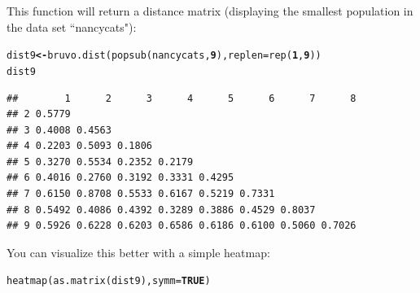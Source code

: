 \documentclass[letterpaper]{article}\usepackage[]{graphicx}\usepackage[]{color}
\makeatletter
\newcommand{\hlnum}[1]{\textcolor[rgb]{0.502,0,0.502}{\textbf{#1}}}%
\newcommand{\hlstd}[1]{\textcolor[rgb]{0,0,0}{#1}}%
\newcommand{\hlkwb}[1]{\textcolor[rgb]{0.502,0.502,0.753}{\textbf{#1}}}%
\newcommand{\hlkwc}[1]{\textcolor[rgb]{0,0.502,0.753}{#1}}%
\newcommand{\hlkwd}[1]{\textcolor[rgb]{0,0.267,0.4}{#1}}%
\newenvironment{kframe}{%
 \def\at@end@of@kframe{}%
 \ifinner\ifhmode%
  \def\at@end@of@kframe{\end{minipage}}%
  \begin{minipage}{\columnwidth}%
 \fi\fi%
 \def\FrameCommand##1{\hskip\@totalleftmargin \hskip-\fboxsep
 \colorbox{shadecolor}{##1}\hskip-\fboxsep
     \hskip-\linewidth \hskip-\@totalleftmargin \hskip\columnwidth}%
 \MakeFramed {\advance\hsize-\width
   \@totalleftmargin\z@ \linewidth\hsize
   \@setminipage}}%
 {\par\unskip\endMakeFramed%
 \at@end@of@kframe}
\newenvironment{knitrout}{}{} %
\makeatother
\begin{document}
This function will return a distance matrix (displaying the smallest population in the data set ``nancycats"):
\begin{knitrout}\footnotesize
{}\color{fgcolor}\begin{kframe}
\begin{alltt}
\hlstd{dist9} \hlkwb{<-} \hlkwd{bruvo.dist}\hlstd{(}\hlkwd{popsub}\hlstd{(nancycats,} \hlnum{9}\hlstd{),} \hlkwc{replen} \hlstd{=} \hlkwd{rep}\hlstd{(}\hlnum{1}\hlstd{,} \hlnum{9}\hlstd{))}
\hlstd{dist9}
\end{alltt}
\begin{verbatim}
##        1      2      3      4      5      6      7      8
## 2 0.5779                                                 
## 3 0.4008 0.4563                                          
## 4 0.2203 0.5093 0.1806                                   
## 5 0.3270 0.5534 0.2352 0.2179                            
## 6 0.4016 0.2760 0.3192 0.3331 0.4295                     
## 7 0.6150 0.8708 0.5533 0.6167 0.5219 0.7331              
## 8 0.5492 0.4086 0.4392 0.3289 0.3886 0.4529 0.8037       
## 9 0.5926 0.6228 0.6203 0.6586 0.6186 0.6100 0.5060 0.7026
\end{verbatim}
\end{kframe}
\end{knitrout}


You can visualize this better with a simple heatmap:

\begin{knitrout}\footnotesize
{}\color{fgcolor}\begin{kframe}
\begin{alltt}
\hlkwd{heatmap}\hlstd{(}\hlkwd{as.matrix}\hlstd{(dist9),} \hlkwc{symm} \hlstd{=} \hlnum{TRUE}\hlstd{)}
\end{alltt}
\end{kframe}
\end{knitrout}
\end{document}
